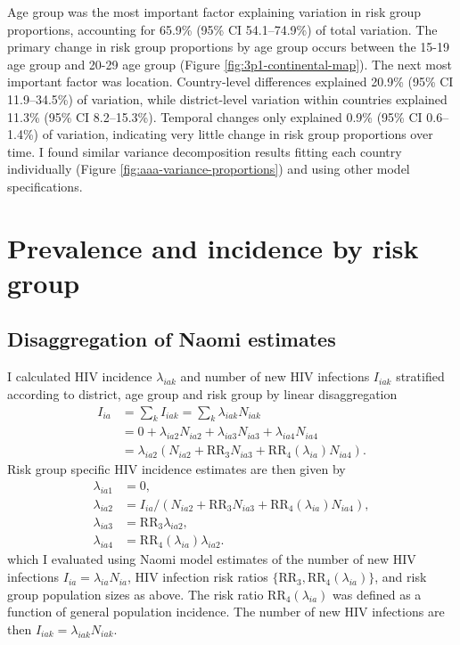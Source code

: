 \documentclass[a4paper, nobind]{templates/ociamthesis}
\begin{document}
Age group was the most important factor explaining variation in risk group proportions, accounting for 65.9\% (95\% CI 54.1--74.9\%) of total variation.
The primary change in risk group proportions by age group occurs between the 15-19 age group and 20-29 age group (Figure \ref{fig:3p1-continental-map}).
The next most important factor was location.
Country-level differences explained 20.9\% (95\% CI 11.9--34.5\%) of variation, while district-level variation within countries explained 11.3\% (95\% CI 8.2--15.3\%).
Temporal changes only explained 0.9\% (95\% CI 0.6--1.4\%) of variation, indicating very little change in risk group proportions over time.
I found similar variance decomposition results fitting each country individually (Figure \ref{fig:aaa-variance-proportions}) and using other model specifications.

\hypertarget{prevalence-and-incidence-by-risk-group}{%
\section{Prevalence and incidence by risk group}\label{prevalence-and-incidence-by-risk-group}}

\hypertarget{disaggregation-of-naomi-estimates}{%
\subsection{Disaggregation of Naomi estimates}\label{disaggregation-of-naomi-estimates}}

I calculated HIV incidence \(\lambda_{iak}\) and number of new HIV infections \(I_{iak}\) stratified according to district, age group and risk group by linear disaggregation
\begin{align}
    I_{ia} &= \sum_k I_{iak} = \sum_k \lambda_{iak}N_{iak} \\
    &= 0 + \lambda_{ia2} N_{ia2} + \lambda_{ia3} N_{ia3} + \lambda_{ia4} N_{ia4} \\
    &= \lambda_{ia2} \left(N_{ia2}  + \text{RR}_{3} N_{ia3} + \text{RR}_4(\lambda_{ia}) N_{ia4}  \right).
\end{align}
Risk group specific HIV incidence estimates are then given by
\begin{align}
    \lambda_{ia1} &= 0, \\
    \lambda_{ia2} &= I_{ia} / \left(N_{ia2} + \text{RR}_{3} N_{ia3} + \text{RR}_4(\lambda_{ia}) N_{ia4}\right), \\
    \lambda_{ia3} &= \text{RR}_{3} \lambda_{ia2}, \\
    \lambda_{ia4} &= \text{RR}_4(\lambda_{ia}) \lambda_{ia2}.
\end{align}
which I evaluated using Naomi model estimates of the number of new HIV infections \(I_{ia} = \lambda_{ia} N_{ia}\), HIV infection risk ratios \(\{\text{RR}_3, \text{RR}_4(\lambda_{ia})\}\), and risk group population sizes as above.
The risk ratio \(\text{RR}_4(\lambda_{ia})\) was defined as a function of general population incidence.
The number of new HIV infections are then \(I_{iak} = \lambda_{iak} N_{iak}\).
\end{document}
